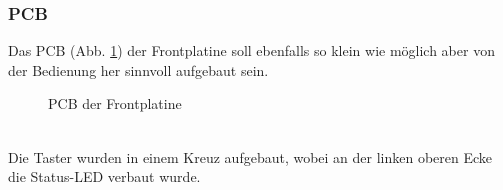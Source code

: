 \subsubsection{PCB}
Das PCB (Abb. \ref {fig:abb3.8}) der Frontplatine soll ebenfalls so klein wie möglich aber von der Bedienung her sinnvoll aufgebaut sein.
\begin{figure} [h]
	\centering
	\caption{PCB der Frontplatine}\label {fig:abb3.8}
\end{figure} \\
Die Taster wurden in einem Kreuz aufgebaut, wobei an der linken oberen Ecke die Status-LED verbaut wurde.







